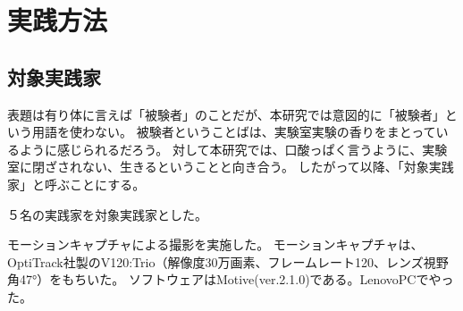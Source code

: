 \chapter{実践方法}

\section{対象実践家}
表題は有り体に言えば「被験者」のことだが、本研究では意図的に「被験者」という用語を使わない。
被験者ということばは、実験室実験の香りをまとっているように感じられるだろう。
対して本研究では、口酸っぱく言うように、実験室に閉ざされない、生きるということと向き合う。
したがって以降、「対象実践家」と呼ぶことにする。

５名の実践家を対象実践家とした。

モーションキャプチャによる撮影を実施した。
モーションキャプチャは、OptiTrack社製のV120:Trio（解像度30万画素、フレームレート120、レンズ視野角47°）をもちいた。
ソフトウェアはMotive(ver.2.1.0)である。LenovoPCでやった。